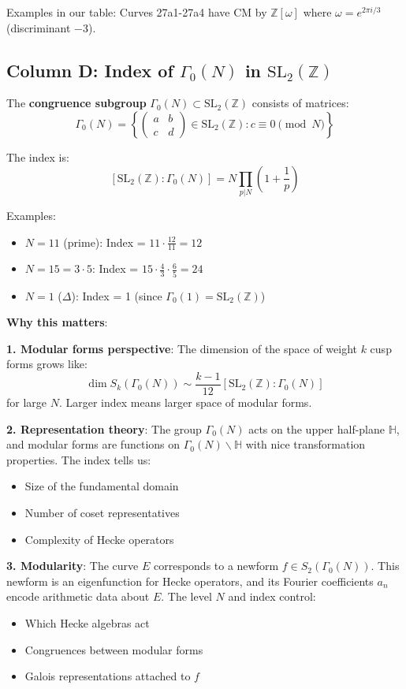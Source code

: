 \documentclass[11pt]{article}
\begin{document}
Examples in our table: Curves 27a1-27a4 have CM by $\mathbb{Z}[\omega]$ where $\omega = e^{2\pi i/3}$ (discriminant $-3$).

\subsection{Column D: Index of $\Gamma_0(N)$ in $\text{SL}_2(\mathbb{Z})$}

The \textbf{congruence subgroup} $\Gamma_0(N) \subset \text{SL}_2(\mathbb{Z})$ consists of matrices:
$$\Gamma_0(N) = \left\{ \begin{pmatrix} a & b \\ c & d \end{pmatrix} \in \text{SL}_2(\mathbb{Z}) : c \equiv 0 \pmod{N} \right\}$$

The index is:
$$[\text{SL}_2(\mathbb{Z}) : \Gamma_0(N)] = N \prod_{p | N} \left(1 + \frac{1}{p}\right)$$

Examples:
\begin{itemize}
\item $N = 11$ (prime): Index = $11 \cdot \frac{12}{11} = 12$
\item $N = 15 = 3 \cdot 5$: Index = $15 \cdot \frac{4}{3} \cdot \frac{6}{5} = 24$
\item $N = 1$ ($\Delta$): Index = 1 (since $\Gamma_0(1) = \text{SL}_2(\mathbb{Z})$)
\end{itemize}

\textbf{Why this matters}:

\textbf{1. Modular forms perspective}: The dimension of the space of weight $k$ cusp forms grows like:
$$\dim S_k(\Gamma_0(N)) \sim \frac{k-1}{12} [\text{SL}_2(\mathbb{Z}) : \Gamma_0(N)]$$
for large $N$. Larger index means larger space of modular forms.

\textbf{2. Representation theory}: The group $\Gamma_0(N)$ acts on the upper half-plane $\mathbb{H}$, and modular forms are functions on $\Gamma_0(N) \backslash \mathbb{H}$ with nice transformation properties. The index tells us:
\begin{itemize}
\item Size of the fundamental domain
\item Number of coset representatives
\item Complexity of Hecke operators
\end{itemize}

\textbf{3. Modularity}: The curve $E$ corresponds to a newform $f \in S_2(\Gamma_0(N))$. This newform is an eigenfunction for Hecke operators, and its Fourier coefficients $a_n$ encode arithmetic data about $E$. The level $N$ and index control:
\begin{itemize}
\item Which Hecke algebras act
\item Congruences between modular forms
\item Galois representations attached to $f$
\end{itemize}
\end{document}
